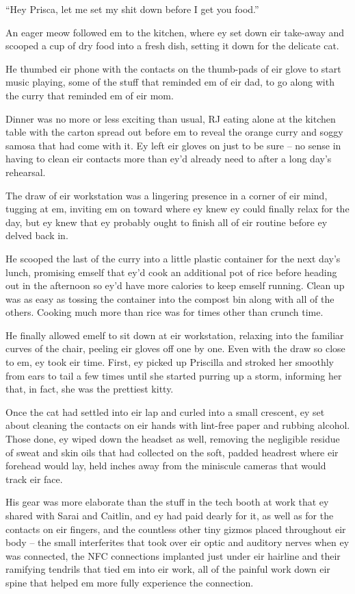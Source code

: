 ``Hey Prisca, let me set my shit down before I get you food.''

An eager meow followed em to the kitchen, where ey set down eir take-away and scooped a cup of dry food into a fresh dish, setting it down for the delicate cat.

He thumbed eir phone with the contacts on the thumb-pads of eir glove to start music playing, some of the stuff that reminded em of eir dad, to go along with the curry that reminded em of eir mom.

Dinner was no more or less exciting than usual, RJ eating alone at the kitchen table with the carton spread out before em to reveal the orange curry and soggy samosa that had come with it.  Ey left eir gloves on just to be sure -- no sense in having to clean eir contacts more than ey'd already need to after a long day's rehearsal.

The draw of eir workstation was a lingering presence in a corner of eir mind, tugging at em, inviting em on toward where ey knew ey could finally relax for the day, but ey knew that ey probably ought to finish all of eir routine before ey delved back in.

He scooped the last of the curry into a little plastic container for the next day's lunch, promising emself that ey'd cook an additional pot of rice before heading out in the afternoon so ey'd have more calories to keep emself running. Clean up was as easy as tossing the container into the compost bin along with all of the others.  Cooking much more than rice was for times other than crunch time.

He finally allowed emelf to sit down at eir workstation, relaxing into the familiar curves of the chair, peeling eir gloves off one by one.  Even with the draw so close to em, ey took eir time.  First, ey picked up Priscilla and stroked her smoothly from ears to tail a few times until she started purring up a storm, informing her that, in fact, she was the prettiest kitty.

Once the cat had settled into eir lap and curled into a small crescent, ey set about cleaning the contacts on eir hands with lint-free paper and rubbing alcohol.  Those done, ey wiped down the headset as well, removing the negligible residue of sweat and skin oils that had collected on the soft, padded headrest where eir forehead would lay, held inches away from the miniscule cameras that would track eir face.

His gear was more elaborate than the stuff in the tech booth at work that ey shared with Sarai and Caitlin, and ey had paid dearly for it, as well as for the contacts on eir fingers, and the countless other tiny gizmos placed throughout eir body -- the small interferites that took over eir optic and auditory nerves when ey was connected, the NFC connections implanted just under eir hairline and their ramifying tendrils that tied em into eir work, all of the painful work down eir spine that helped em more fully experience the connection.

